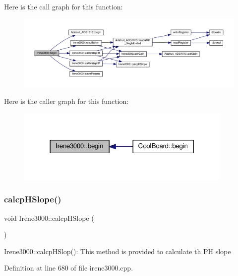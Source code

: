 Here is the call graph for this function\+:\nopagebreak
\begin{figure}[H]
\begin{center}
\leavevmode
\includegraphics[width=350pt]{d6/d03/class_irene3000_ad5891806c500ae1007afe52b9e304c2b_cgraph}
\end{center}
\end{figure}
Here is the caller graph for this function\+:\nopagebreak
\begin{figure}[H]
\begin{center}
\leavevmode
\includegraphics[width=297pt]{d6/d03/class_irene3000_ad5891806c500ae1007afe52b9e304c2b_icgraph}
\end{center}
\end{figure}
\mbox{\label{class_irene3000_a81f6a79e546679692053f7ac1af49613}} 
\subsubsection{\texorpdfstring{calcp\+H\+Slope()}{calcpHSlope()}}
{\footnotesize\ttfamily void Irene3000\+::calcp\+H\+Slope (\begin{DoxyParamCaption}{ }\end{DoxyParamCaption})}

Irene3000\+::calcp\+H\+Slop()\+: This method is provided to calculate th PH slope 

Definition at line 680 of file irene3000.\+cpp.


